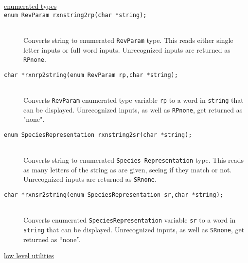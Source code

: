 \documentclass {book}
\newcommand {\ttt} {\texttt}
\begin{document}
\begin{description}

\item[\underline{enumerated types}]

\item[\ttt{enum RevParam rxnstring2rp(char *string);}]
\hfill \\
Converts string to enumerated \ttt{RevParam} type. This reads either single letter inputs or full word inputs. Unrecognized inputs are returned as \ttt{RPnone}.

\item[\ttt{char *rxnrp2string(enum RevParam rp,char *string);}]
\hfill \\
Converts \ttt{RevParam} enumerated type variable \ttt{rp} to a word in \ttt{string} that can be displayed. Unrecognized inputs, as well as \ttt{RPnone}, get returned as "none".

\item[\ttt{enum SpeciesRepresentation rxnstring2sr(char *string);}]
\hfill \\
Converts string to enumerated \ttt{Species Representation} type. This reads as many letters of the string as are given, seeing if they match or not. Unrecognized inputs are returned as \ttt{SRnone}.

\item[\ttt{char *rxnsr2string(enum SpeciesRepresentation sr,char *string);}]
\hfill \\
Converts enumerated \ttt{SpeciesRepresentation} variable \ttt{sr} to a word in \ttt{string} that can be displayed. Unrecognized inputs, as well as \ttt{SRnone}, get returned as ``none''.

\item[\underline{low level utilities}]


\end{description}
\end{document}
